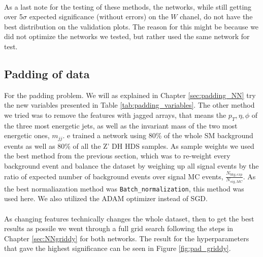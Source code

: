 \documentclass[12pt, a4paper]{book}
\begin{document}
\\As a last note for the testing of these methods, the networks, while still getting over 5$\sigma$ expected significance (without errors) on the $W$ chanel, do not have the best distribution on the validation plots. The reason for this might be because 
we did not optimize the networks we tested, but rather used the same network for test. 
\clearpage


\subsection{Padding of data}\label{sec:padding_NN_res}
For the padding problem. We will as explained in Chapter \ref{sec:padding_NN} try the new variables presented in Table \ref{tab:padding_variables}. The other method we tried was to remove the features with jagged arrays, that means the $p_T, \eta, \phi$ of the three most energetic jets, as well as the invariant mass of the two most energetic ones, $m_{jj}$.
e trained a network using 80\% of the whole SM background events as well as 80\% of all the Z' DH HDS samples. As sample weights we used the best method from the previous section, which was to re-weight every background event and balance the dataset by weighing up all signal events by the ratio of expected number of background events over signal MC events, $\frac{N_{bkg,exp}}{N_{sig,MC}}$. 
As the best normaliazation method was \verb|Batch_normalization|, this method was used here. We also utilized the ADAM optimizer instead of SGD.\\
\\As changing features technically changes the whole dataset, then to get the best results as possile we went through a full grid search following the steps in Chapter \ref{sec:NNgriddy} for both networks. The result for the hyperparameters that gave the highest significance can be seen in Figure \ref{fig:pad_griddy}.
\graphicspath{{../../../Plots/NeuralNetwork/Padding/}}
\end{document}
